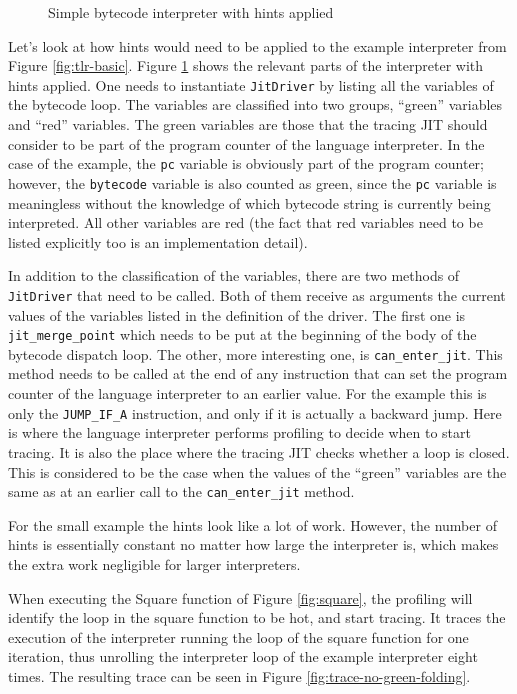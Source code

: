 \documentclass{sig-alternate}
\begin{document}
\begin{figure}

\caption{Simple bytecode interpreter with hints applied}
\label{fig:tlr-full}
\end{figure}

Let's look at how hints would need to be applied to the example interpreter
from Figure \ref{fig:tlr-basic}. Figure \ref{fig:tlr-full} shows the relevant
parts of the interpreter with hints applied.  One needs to instantiate
\texttt{JitDriver} by listing all the variables of the bytecode loop.
The variables are classified into two groups, ``green'' variables and ``red''
variables. The green variables are those that the tracing JIT should consider to
be part of the program counter of the language interpreter. In the case of the
example, the \texttt{pc} variable is obviously part of the program counter;
however, the \texttt{bytecode} variable is also counted as green, since the
\texttt{pc} variable is meaningless without the knowledge of which bytecode
string is currently being interpreted. All other variables are red (the fact
that red variables need to be listed explicitly too is an implementation
detail).

In addition to the classification of the variables, there are two methods of
\texttt{JitDriver} that need to be called. Both of them receive as arguments the
current values of the variables listed in the definition of the driver. The
first one is \texttt{jit\_merge\_point} which needs to be put at the beginning
of the body of the bytecode dispatch loop. The other, more interesting one, is
\texttt{can\_enter\_jit}. This method needs to be called at the end of any
instruction that can set the program counter of the language interpreter to an
earlier value. For the example this is only the \texttt{JUMP\_IF\_A}
instruction, and only if it is actually a backward jump. Here is
where the language interpreter performs profiling to decide
when to start tracing. It is also the place where the tracing JIT checks
whether a loop is closed. This is considered to be the case when the values of
the ``green'' variables are the same as at an earlier call to the
\texttt{can\_enter\_jit} method.

For the small example the hints look like a lot of work. However, the number of
hints is essentially constant no matter how large the interpreter is, which
makes the extra work negligible for larger interpreters.

When executing the Square function of Figure \ref{fig:square}, the profiling
will identify the loop in the square function to be hot, and start tracing. It
traces the execution of the interpreter running the loop of the square function
for one iteration, thus unrolling the interpreter loop of the example
interpreter eight times. The resulting trace can be seen in Figure 
\ref{fig:trace-no-green-folding}.
\end{document}
